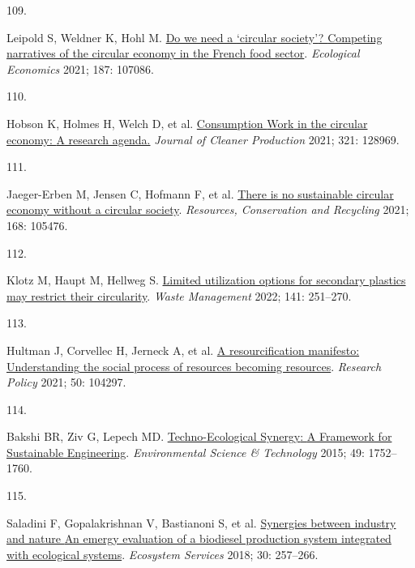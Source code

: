 \documentclass[
  12pt,
  a4paperpaper,
  onecolumn]{article}
\newlength{\cslhangindent}
\newlength{\csllabelwidth}
\newlength{\cslentryspacingunit} %
\newenvironment{CSLReferences}[2] %
 {%
  \setlength{\parindent}{0pt}
  \ifodd #1
  \let\oldpar\par
  \def\par{\hangindent=\cslhangindent\oldpar}
  \fi
  \setlength{\parskip}{#2\cslentryspacingunit}
 }%
 {}
\newcommand{\CSLLeftMargin}[1]{\parbox[t]{\csllabelwidth}{#1}}
\newcommand{\CSLRightInline}[1]{\parbox[t]{\linewidth - \csllabelwidth}{#1}\break}
\begin{document}
\begin{CSLReferences}{0}{0}
\leavevmode{}%
\CSLLeftMargin{109. }%
\CSLRightInline{Leipold S, Weldner K, Hohl M.
\href{https://doi.org/10.1016/j.ecolecon.2021.107086}{Do we need a
{`circular society'}? {Competing} narratives of the circular economy in
the {French} food sector}. \emph{Ecological Economics} 2021; 187:
107086.}

\leavevmode{}%
\CSLLeftMargin{110. }%
\CSLRightInline{Hobson K, Holmes H, Welch D, et al.
\href{https://doi.org/10.1016/J.JCLEPRO.2021.128969}{Consumption {Work}
in the circular economy: {A} research agenda.} \emph{Journal of Cleaner
Production} 2021; 321: 128969.}

\leavevmode{}%
\CSLLeftMargin{111. }%
\CSLRightInline{Jaeger-Erben M, Jensen C, Hofmann F, et al.
\href{https://doi.org/10.1016/j.resconrec.2021.105476}{There is no
sustainable circular economy without a circular society}.
\emph{Resources, Conservation and Recycling} 2021; 168: 105476.}

\leavevmode{}%
\CSLLeftMargin{112. }%
\CSLRightInline{Klotz M, Haupt M, Hellweg S.
\href{https://doi.org/10.1016/J.WASMAN.2022.01.002}{Limited utilization
options for secondary plastics may restrict their circularity}.
\emph{Waste Management} 2022; 141: 251--270.}

\leavevmode{}%
\CSLLeftMargin{113. }%
\CSLRightInline{Hultman J, Corvellec H, Jerneck A, et al.
\href{https://doi.org/10.1016/j.respol.2021.104297}{A resourcification
manifesto: {Understanding} the social process of resources becoming
resources}. \emph{Research Policy} 2021; 50: 104297.}

\leavevmode{}%
\CSLLeftMargin{114. }%
\CSLRightInline{Bakshi BR, Ziv G, Lepech MD.
\href{https://doi.org/10.1021/es5041442}{Techno-{Ecological Synergy}: {A
Framework} for {Sustainable Engineering}}. \emph{Environmental Science
\& Technology} 2015; 49: 1752--1760.}

\leavevmode{}%
\CSLLeftMargin{115. }%
\CSLRightInline{Saladini F, Gopalakrishnan V, Bastianoni S, et al.
\href{https://doi.org/10.1016/j.ecoser.2018.02.004}{Synergies between
industry and nature \textendash{} {An} emergy evaluation of a biodiesel
production system integrated with ecological systems}. \emph{Ecosystem
Services} 2018; 30: 257--266.}


\end{CSLReferences}
\end{document}
